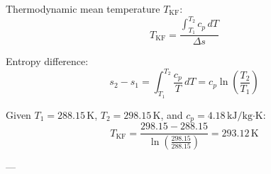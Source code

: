 Thermodynamic mean temperature \( T_{\text{KF}} \):  
\[
T_{\text{KF}} = \frac{\int_{T_1}^{T_2} c_p \, dT}{\Delta s}
\]  

Entropy difference:  
\[
s_2 - s_1 = \int_{T_1}^{T_2} \frac{c_p}{T} \, dT = c_p \ln \left( \frac{T_2}{T_1} \right)
\]  

Given \( T_1 = 288.15 \, \text{K} \), \( T_2 = 298.15 \, \text{K} \), and \( c_p = 4.18 \, \text{kJ/kg·K} \):  
\[
T_{\text{KF}} = \frac{298.15 - 288.15}{\ln \left( \frac{298.15}{288.15} \right)} = 293.12 \, \text{K}
\]  

---